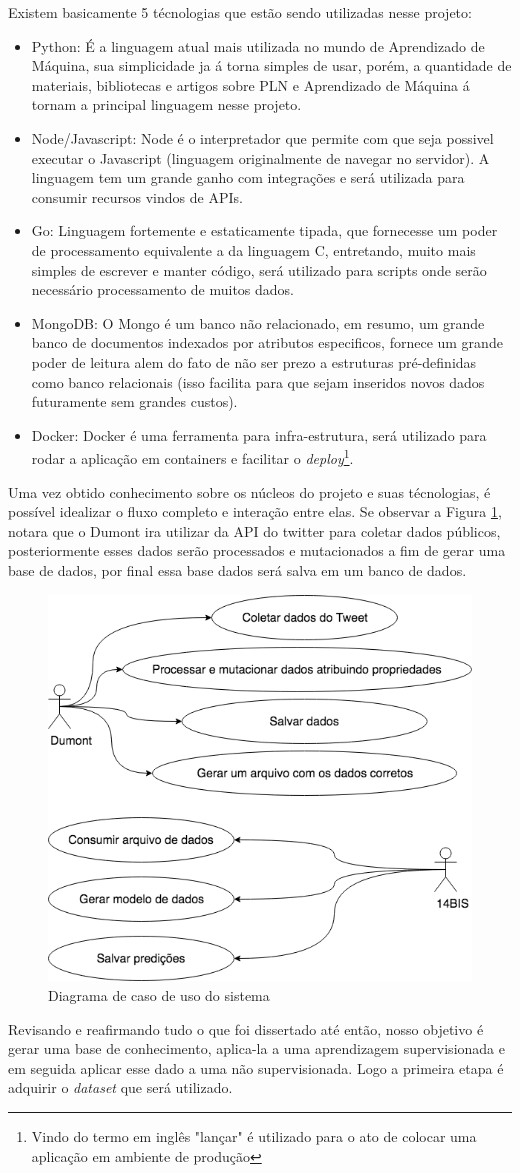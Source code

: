 Existem basicamente 5 técnologias que estão sendo utilizadas nesse projeto:
\begin{itemize}
 \item Python: É a linguagem atual mais utilizada no mundo de Aprendizado de Máquina, sua simplicidade ja á torna simples de usar, porém, a quantidade de materiais, bibliotecas e artigos sobre PLN e Aprendizado de Máquina á tornam a principal linguagem nesse projeto.
 \item Node/Javascript: Node é o interpretador que permite com que seja possivel executar o Javascript (linguagem originalmente de navegar no servidor). A linguagem tem um grande ganho com integrações e será utilizada para consumir recursos vindos de APIs.
 \item Go: Linguagem fortemente e estaticamente tipada, que fornecesse um poder de processamento equivalente a da linguagem C, entretando, muito mais simples de escrever e manter código, será utilizado para scripts onde serão necessário processamento de muitos dados.
 \item MongoDB: O Mongo é um banco não relacionado, em resumo, um grande banco de documentos indexados por atributos especificos, fornece um grande poder de leitura alem do fato de não ser prezo a estruturas pré-definidas como banco relacionais (isso facilita para que sejam inseridos novos dados futuramente sem grandes custos).
 \item Docker: Docker é uma ferramenta para infra-estrutura, será utilizado para rodar a aplicação em containers e facilitar o \textit{deploy}\footnote{Vindo do termo em inglês "lançar" é utilizado para o ato de colocar uma aplicação em ambiente de produção}.
\end{itemize}

Uma vez obtido conhecimento sobre os núcleos do projeto e suas técnologias, é possível idealizar o fluxo completo e interação entre elas. Se observar a Figura \ref{fig:tcc_caso_de_uso}, notara que o Dumont ira utilizar da API do twitter para coletar dados públicos, posteriormente esses dados serão processados e mutacionados a fim de gerar uma base de dados, por final essa base dados será salva em um banco de dados.

\begin{figure}
    \centering
    \includegraphics[width=.6\textwidth]{imagens/tcc_caso_de_uso.png}
    \caption{Diagrama de caso de uso do sistema}
    \label{fig:tcc_caso_de_uso}
\end{figure}

Revisando e reafirmando tudo o que foi dissertado até então, nosso objetivo é gerar uma base de conhecimento, aplica-la a uma aprendizagem supervisionada e em seguida aplicar esse dado a uma não supervisionada. Logo a primeira etapa é adquirir o \textit{dataset} que será utilizado.